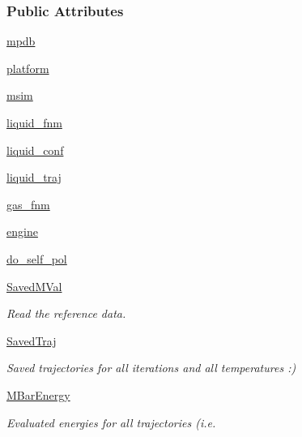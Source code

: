 \subsubsection*{Public Attributes}
\begin{DoxyCompactItemize}
\item 
\hyperlink{classforcebalance_1_1openmmio_1_1Liquid__OpenMM_aaaa8d66c5bb45d847e1fbcd3953fe0d3}{mpdb}
\item 
\hyperlink{classforcebalance_1_1openmmio_1_1Liquid__OpenMM_ab9cc3ba5e2cb545e714733efe99c00e1}{platform}
\item 
\hyperlink{classforcebalance_1_1openmmio_1_1Liquid__OpenMM_acf60da4350bb882795a8143b1b85ca57}{msim}
\item 
\hyperlink{classforcebalance_1_1openmmio_1_1Liquid__OpenMM_a688bca0f29a2d62deb7fad0a488a7a14}{liquid\-\_\-fnm}
\item 
\hyperlink{classforcebalance_1_1openmmio_1_1Liquid__OpenMM_ad7ba892bf3ec0f986f17ec12e478e977}{liquid\-\_\-conf}
\item 
\hyperlink{classforcebalance_1_1openmmio_1_1Liquid__OpenMM_a113b333fdca5faedc03600d204c3a49b}{liquid\-\_\-traj}
\item 
\hyperlink{classforcebalance_1_1openmmio_1_1Liquid__OpenMM_a7b835f5dbacf1c31ead8c0c47e6895ce}{gas\-\_\-fnm}
\item 
\hyperlink{classforcebalance_1_1openmmio_1_1Liquid__OpenMM_ac46cb2eaf7e4fcbe92d24d213b017d57}{engine}
\item 
\hyperlink{classforcebalance_1_1liquid_1_1Liquid_a2cf65dd56f058636e68a0b3bf2af210e}{do\-\_\-self\-\_\-pol}
\item 
\hyperlink{classforcebalance_1_1liquid_1_1Liquid_a5b9df1bf79a641156429e292f47b6afd}{Saved\-M\-Val}
\begin{DoxyCompactList}\small\item\em Read the reference data. \end{DoxyCompactList}\item 
\hyperlink{classforcebalance_1_1liquid_1_1Liquid_a0da0c00cdc193c9c470d7e528043fb99}{Saved\-Traj}
\begin{DoxyCompactList}\small\item\em Saved trajectories for all iterations and all temperatures \-:) \end{DoxyCompactList}\item 
\hyperlink{classforcebalance_1_1liquid_1_1Liquid_a6c00a87ae43f535118b77d41af51a5d7}{M\-Bar\-Energy}
\begin{DoxyCompactList}\small\item\em Evaluated energies for all trajectories (i.\-e. \end{DoxyCompactList}\item 

\end{DoxyCompactItemize}
